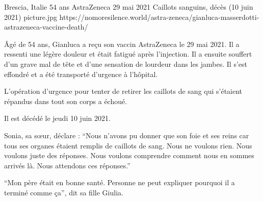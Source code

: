 {Brescia, Italie}
{54 ans}
{AstraZeneca}
{29 mai 2021}
{Caillots sanguins, décès (10 juin 2021)}
{picture.jpg}
{https://nomoresilence.world/astra-zeneca/gianluca-masserdotti-astrazeneca-vaccine-death/}
{

Âgé de 54 ans, Gianluca a reçu son vaccin AstraZeneca le 29 mai 2021. Il a
ressenti une légère douleur et était fatigué après l'injection. Il a ensuite
souffert d'un grave mal de tête et d'une sensation de lourdeur dans les
jambes. Il s'est effondré et a été transporté d'urgence à l'hôpital.

L'opération d'urgence pour tenter de retirer les caillots de sang qui s'étaient
répandus dans tout son corps a échoué.

Il est décédé le jeudi 10 juin 2021.

Sonia, sa sœur, déclare : “Nous n'avons pu donner que son foie et ses reins car
tous ses organes étaient remplis de caillots de sang. Nous ne voulons rien. Nous
voulons juste des réponses. Nous voulons comprendre comment nous en sommes
arrivés là. Nous attendons ces réponses.”

“Mon père était en bonne santé. Personne ne peut expliquer pourquoi il a terminé
comme ça”, dit sa fille Giulia.

}
